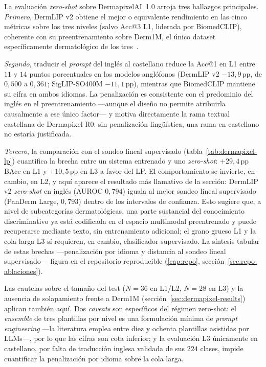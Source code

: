 La evaluación \emph{zero-shot} sobre DermapixelAI~1.0 arroja tres
hallazgos principales. \textit{Primero}, DermLIP v2 obtiene el mejor o
equivalente rendimiento en las cinco métricas sobre los tres niveles
(salvo Acc@3 L1, liderada por BiomedCLIP), coherente con su
preentrenamiento sobre Derm1M, el único dataset específicamente
dermatológico de los tres~\cite{derm1m}.

\textit{Segundo}, traducir el \emph{prompt} del inglés al castellano
reduce la Acc@1 en L1 entre $11$ y $14$ puntos porcentuales en los
modelos anglófonos (DermLIP v2 $-13{,}9$\,pp, de $0{,}500$ a $0{,}361$;
SigLIP-SO400M $-11{,}1$\,pp), mientras que BiomedCLIP mantiene su
cifra en ambos idiomas. La penalización es consistente con el
predominio del inglés en el preentrenamiento ---aunque el diseño no
permite atribuirla causalmente a ese único factor--- y motiva
directamente la rama textual castellana de Dermapixel R0: sin
penalización lingüística, una rama en castellano no estaría
justificada.

\textit{Tercero}, la comparación con el sondeo lineal supervisado
(tabla~\ref{tab:dermapixel-lp}) cuantifica la brecha entre un sistema
entrenado y uno \emph{zero-shot}: $+29{,}4$\,pp BAcc en L1 y
$+10{,}5$\,pp en L3 a favor del LP. El comportamiento se invierte, en
cambio, en L2, y aquí aparece el resultado más llamativo de la
sección: DermLIP v2 \emph{zero-shot} en inglés (AUROC $0{,}794$) iguala
al mejor sondeo lineal supervisado (PanDerm Large, $0{,}793$) dentro de
los intervalos de confianza. Esto sugiere que, a nivel de
subcategorías dermatológicas, una parte sustancial del conocimiento
discriminativo ya está codificada en el espacio multimodal
preentrenado y puede recuperarse mediante texto, sin entrenamiento
adicional; el grano grueso L1 y la cola larga L3 sí requieren, en
cambio, clasificador supervisado. La síntesis tabular de estas
brechas ---penalización por idioma y distancia al sondeo lineal
supervisado--- figura en el repositorio reproducible (\ref{cap:repo},
sección~\ref{sec:repo-ablaciones}).

Las cautelas sobre el tamaño del test ($N = 36$ en L1/L2, $N = 28$
en L3) y la ausencia de solapamiento frente a Derm1M
(sección~\ref{sec:dermapixel-results}) aplican también aquí. Dos
\emph{caveats} son específicos del régimen zero-shot: el
\emph{ensemble} de tres plantillas por nivel es una formulación
mínima de \emph{prompt engineering} ---la literatura emplea entre
diez y ochenta plantillas asistidas por LLMs---, por lo que las
cifras son cota inferior; y la evaluación L3 únicamente en castellano,
por falta de traducción inglesa validada de sus $224$ clases, impide
cuantificar la penalización por idioma sobre la cola larga.

